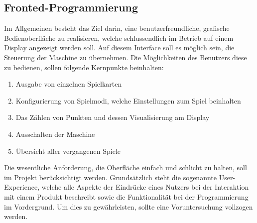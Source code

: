 \subsection{Fronted-Programmierung}\label{subsec:fronted-programmierung}
Im Allgemeinen besteht das Ziel darin, eine benutzerfreundliche, grafische Bedienoberfläche zu realisieren, welche schlussendlich im Betrieb auf einem Display angezeigt werden soll.
Auf diesem Interface soll es möglich sein, die Steuerung der Maschine zu übernehmen.
Die Möglichkeiten des Benutzers diese zu bedienen, sollen folgende Kernpunkte beinhalten:
\begin{enumerate}
    \item Ausgabe von einzelnen Spielkarten
    \item Konfigurierung von Spielmodi, welche Einstellungen zum Spiel beinhalten
    \item Das Zählen von Punkten und dessen Visualisierung am Display
    \item Ausschalten der Maschine
    \item Übersicht aller vergangenen Spiele
\end{enumerate}
Die wesentliche Anforderung, die Oberfläche einfach und schlicht zu halten, soll im Projekt berücksichtigt werden.
Grundsätzlich steht die sogenannte User-Experience, welche alle Aspekte der Eindrücke eines Nutzers bei der Interaktion mit einem Produkt beschreibt sowie die Funktionalität bei der Programmierung im Vordergrund.
Um dies zu gewährleisten, sollte eine Voruntersuchung vollzogen werden.
